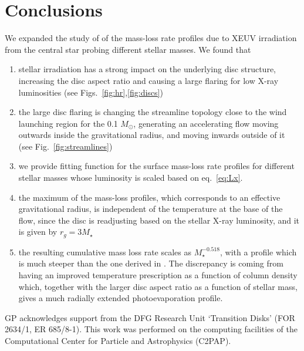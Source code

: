 \documentclass{aa}
\begin{document}
\section{Conclusions}\label{sec:conclusions}

  We expanded the study of  of the mass-loss rate profiles due to XEUV irradiation from the central star probing different stellar masses.
  We found that

   \begin{enumerate}
      \item stellar irradiation has a strong impact on the underlying disc structure, increasing the disc aspect ratio and causing a large flaring for low X-ray luminosities (see Figs.~\ref{fig:hr},\ref{fig:discs})
      \item the large disc flaring is changing the streamline topology close to the wind launching region for the 0.1 $M_\odot$, generating an accelerating flow moving outwards inside the gravitational radius, and moving inwards outside of it (see Fig.~\ref{fig:streamlines})
      \item we provide fitting function for the surface mass-loss rate profiles for different stellar masses whose luminosity is scaled based on eq.~\ref{eq:Lx}.
      \item the maximum of the mass-loss profiles, which corresponds to an effective gravitational radius, is independent of the temperature at the base of the flow, since the disc is readjusting based on the stellar X-ray luminosity, and it is given by $r_g=3M_\star$
      \item the resulting cumulative mass loss rate scales as $M_\star^{-0.518}$, with a profile which is much steeper than the one derived in \citep{2012MNRAS.422.1880O}. The discrepancy is coming from having an improved temperature prescription as a function of column density which, together with the larger disc aspect ratio as a function of stellar mass, gives a much radially extended photoevaporation profile.
   \end{enumerate}

\begin{acknowledgements}
    GP acknowledges support from the DFG Research Unit ‘Transition Disks’ (FOR 2634/1, ER 685/8-1).
    This work was performed on the computing facilities of the Computational Center for Particle and Astrophysics (C2PAP).
\end{acknowledgements}
\end{document}
